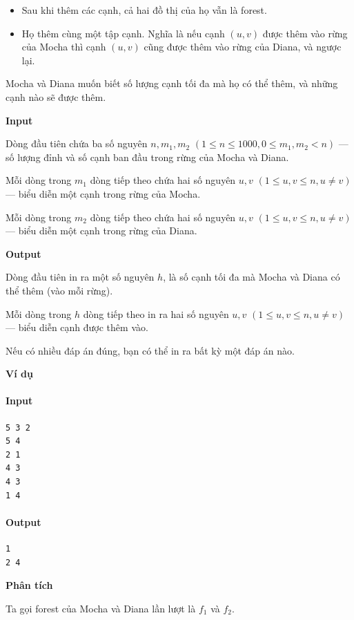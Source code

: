 \documentclass{article}
\begin{document}
\begin{itemize}
    \item Sau khi thêm các cạnh, cả hai đồ thị của họ vẫn là forest.
    \item Họ thêm cùng một tập cạnh. Nghĩa là nếu cạnh $(u,v)$ được thêm vào rừng của Mocha thì cạnh $(u,v)$ cũng được thêm vào rừng của Diana, và ngược lại.
\end{itemize}

Mocha và Diana muốn biết số lượng cạnh tối đa mà họ có thể thêm, và những cạnh nào sẽ được thêm.  

\textbf{Input}  

Dòng đầu tiên chứa ba số nguyên $n, m_1, m_2$ $(1 \leq n \leq 1000, 0 \leq m_1, m_2 < n)$ — số lượng đỉnh và số cạnh ban đầu trong rừng của Mocha và Diana.  

Mỗi dòng trong $m_1$ dòng tiếp theo chứa hai số nguyên $u, v$ $(1 \leq u, v \leq n, u \neq v)$ — biểu diễn một cạnh trong rừng của Mocha.  

Mỗi dòng trong $m_2$ dòng tiếp theo chứa hai số nguyên $u, v$ $(1 \leq u, v \leq n, u \neq v)$ — biểu diễn một cạnh trong rừng của Diana.

\textbf{Output}

Dòng đầu tiên in ra một số nguyên $h$, là số cạnh tối đa mà Mocha và Diana có thể thêm (vào mỗi rừng).  

Mỗi dòng trong $h$ dòng tiếp theo in ra hai số nguyên $u, v$ $(1 \leq u, v \leq n, u \neq v)$ — biểu diễn cạnh được thêm vào.  

Nếu có nhiều đáp án đúng, bạn có thể in ra bất kỳ một đáp án nào.

\textbf{Ví dụ}
\paragraph{Input}
\begin{lstlisting}
5 3 2
5 4
2 1
4 3
4 3
1 4
\end{lstlisting}

\paragraph{Output}
\begin{lstlisting}
1
2 4
\end{lstlisting}

\textbf{Phân tích}

Ta gọi forest của Mocha và Diana lần lượt là $f_1$ và $f_2$.\\
\end{document}
